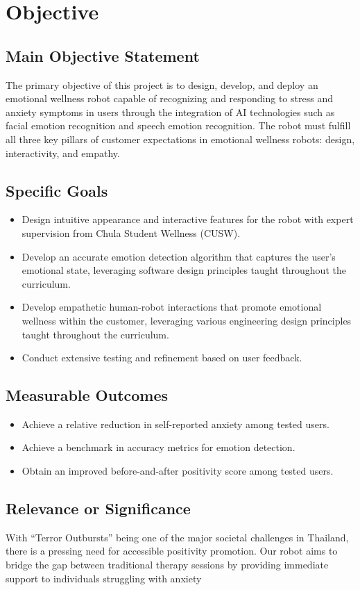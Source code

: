 \section{Objective}
\label{sec:objective}
\subsection{Main Objective Statement}
The primary objective of this project is to design, develop, and deploy an emotional wellness robot capable of recognizing and responding to stress and anxiety symptoms in users through the integration of AI technologies such as facial emotion recognition and speech emotion recognition. The robot must fulfill all three key pillars of customer expectations in emotional wellness robots: design, interactivity, and empathy.


\subsection{Specific Goals}
\begin{itemize}
    \item Design intuitive appearance and interactive features for the robot with expert supervision from Chula Student Wellness (CUSW).
    \item Develop an accurate emotion detection algorithm that captures the user’s emotional state, leveraging software design principles taught throughout the curriculum.
    \item Develop empathetic human-robot interactions that promote emotional wellness within the customer, leveraging various engineering design principles taught throughout the curriculum.
    \item Conduct extensive testing and refinement based on user feedback.
\end{itemize}
    
\subsection{Measurable Outcomes}
\begin{itemize}
    \item Achieve a relative reduction in self-reported anxiety among tested users.
    \item Achieve a benchmark in accuracy metrics for emotion detection.
    \item Obtain an improved before-and-after positivity score among tested users.
\end{itemize}

\subsection{Relevance or Significance}
With “Terror Outbursts” being one of the major societal challenges in Thailand, there is a pressing need
for accessible positivity promotion. Our robot aims to bridge the gap between traditional therapy sessions
by providing immediate support to individuals struggling with anxiety
